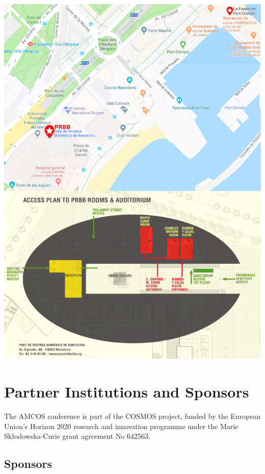 \documentclass[
	openany, %
	parskip=full, %
	12pt, %
	a4paper, %
]{conferencebooklet} %
\begin{document}
\includegraphics[width=\linewidth]{images/amcos_map}


\chapter{Partner Institutions and Sponsors}

The AMCOS conference is part of the COSMOS project, funded by the European Union’s Horizon 2020 research and innovation programme under the Marie Sk\l{}odowska-Curie grant agreement No 642563.

\section{Sponsors}
\end{document}
